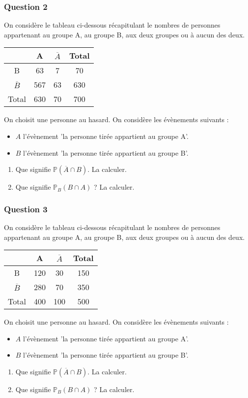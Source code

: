 \documentclass[15pt, mathserif]{beamer}
\begin{document}
\begin{frame} 
	\frametitle{Question 2}
On considère le tableau ci-dessous récapitulant le nombres de personnes appartenant au groupe A, au groupe B, aux deux groupes ou à aucun des deux.\begin{center} 
 \begin{tabular}{|c|c|c|c|} 
 \cline{2-4} 
 \multicolumn{1}{c|}{} & A & $\overline{A}$ & Total \\\hline 
 B   &63  &7& 70 \\\hline 
 $\overline{B}$   &567 & 63 & 630 \\\hline 
 Total   &630&70 &700 \\\hline  
 \end{tabular} 
 \end{center} On choisit une personne au hasard. On considère les évènements suivants : 
 \begin{itemize} 
 \item $A$ l'évènement 'la personne tirée appartient au groupe A'. 
 \item $B$ l'évènement 'la personne tirée appartient au groupe B'. 
 \end{itemize} 
 \begin{enumerate} 
 \item Que signifie $\mathbb{P}(\overline{A} \cap B)$. La calculer. 
 \item Que signifie $\mathbb{P}_{B} (B \cap A)$ ? La calculer. 
  \end{enumerate} 
 \end{frame}


\begin{frame} 
	\frametitle{Question 3}
On considère le tableau ci-dessous récapitulant le nombres de personnes appartenant au groupe A, au groupe B, aux deux groupes ou à aucun des deux.\begin{center} 
 \begin{tabular}{|c|c|c|c|} 
 \cline{2-4} 
 \multicolumn{1}{c|}{} & A & $\overline{A}$ & Total \\\hline 
 B   &120  &30& 150 \\\hline 
 $\overline{B}$   &280 & 70 & 350 \\\hline 
 Total   &400&100 &500 \\\hline  
 \end{tabular} 
 \end{center} On choisit une personne au hasard. On considère les évènements suivants : 
 \begin{itemize} 
 \item $A$ l'évènement 'la personne tirée appartient au groupe A'. 
 \item $B$ l'évènement 'la personne tirée appartient au groupe B'. 
 \end{itemize} 
 \begin{enumerate} 
 \item Que signifie $\mathbb{P}(\overline{A} \cap B)$. La calculer. 
 \item Que signifie $\mathbb{P}_{B} (B \cap A)$ ? La calculer. 
  \end{enumerate} 
 \end{frame}
\end{document}

